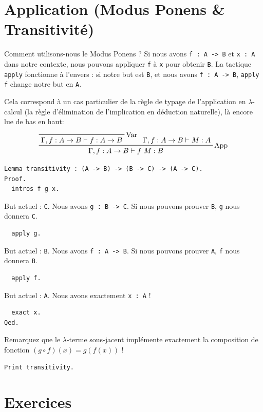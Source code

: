 \documentclass[11pt,a4paper]{article}
\begin{document}
\section{Application (Modus Ponens \& Transitivité)}

Comment utilisons-nous le Modus Ponens ?
Si nous avons \texttt{f : A -> B} et \texttt{x : A} dans notre contexte, nous pouvons appliquer \texttt{f} à \texttt{x} pour obtenir \texttt{B}. La tactique \texttt{apply} fonctionne à l'envers : si notre but est \texttt{B}, et nous avons \texttt{f : A -> B}, \texttt{apply f} change notre but en \texttt{A}.

Cela correspond à un cas particulier de la règle de typage de l'application en $\lambda$-calcul (la règle d'élimination de l'implication en déduction naturelle), là encore lue de bas en haut:
$$\prftree[r]{App}{\prftree[r]{Var}{\Gamma, f : A \to B \vdash f : A \to B}}{\prfassumption{\Gamma, f : A \to B \vdash M : A}}{\Gamma, f : A \to B \vdash f\ M : B}$$

\begin{lstlisting}
Lemma transitivity : (A -> B) -> (B -> C) -> (A -> C).
Proof.
  intros f g x.
\end{lstlisting}

But actuel : \texttt{C}. Nous avons \texttt{g : B -> C}. Si nous pouvons prouver \texttt{B}, \texttt{g} nous donnera \texttt{C}.

\begin{lstlisting}
  apply g.
\end{lstlisting}

But actuel : \texttt{B}. Nous avons \texttt{f : A -> B}. Si nous pouvons prouver \texttt{A}, \texttt{f} nous donnera \texttt{B}.

\begin{lstlisting}
  apply f.
\end{lstlisting}

But actuel : \texttt{A}. Nous avons exactement \texttt{x : A} !

\begin{lstlisting}
  exact x.
Qed.
\end{lstlisting}

Remarquez que le $\lambda$-terme sous-jacent implémente exactement la composition de fonction $(g \circ f)(x) = g(f(x))$ !

\begin{lstlisting}
Print transitivity.
\end{lstlisting}

\section{Exercices}
\end{document}
